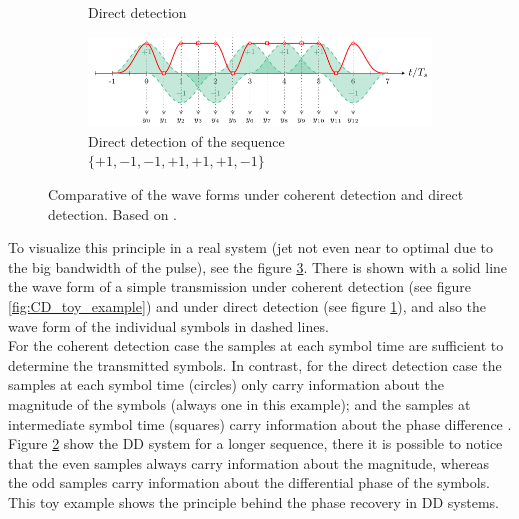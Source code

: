 \begin{figure}[htb]
\begin{subfigure}[b]{0.49\textwidth}
         \caption{Direct detection}
         \label{fig:DD_toy_example}
     \end{subfigure}
     \hfill
     \vspace{10mm}
     \begin{subfigure}[b]{0.8\textwidth}
         \centering
         \includegraphics[width=\textwidth]{images/DD_toy_example_long_sq.pdf}
         \caption{Direct detection of the sequence $\{+1,-1,-1,+1,+1,+1,-1\}$}
         \label{fig:DD_toy_example_long_sq}
     \end{subfigure}
        \caption{Comparative of the wave forms under coherent detection and direct detection. Based on \cite{Secondini, Plabst_DD}.}
        \label{fig:DD_vs_CD}
\end{figure}

To visualize this principle in a real system (jet not even near to optimal due to the big bandwidth of the pulse), see the figure \ref{fig:DD_vs_CD}. There is shown with a solid line the wave form of a simple transmission under coherent detection (see figure \ref{fig:CD_toy_example}) and under direct detection (see figure \ref{fig:DD_toy_example}), and also the wave form of the individual symbols in dashed lines.\\

For the coherent detection case the samples at each symbol time are sufficient to determine the transmitted symbols. In contrast, for the direct detection case the samples at each symbol time (circles) only carry information about the magnitude of the symbols (always one in this example); and the samples at intermediate symbol time (squares) carry information about the phase difference \cite{Secondini}.\\

Figure \ref{fig:DD_toy_example_long_sq} show the DD system for a longer sequence, there it is possible to notice that the even samples always carry information about the magnitude, whereas the odd samples carry information about the differential phase of the symbols. This toy example shows the principle behind the phase recovery in DD systems.\\

